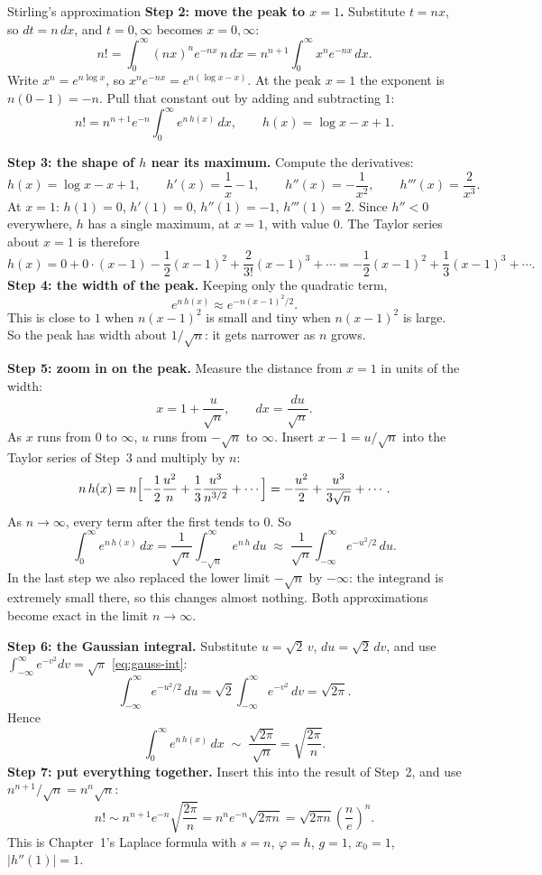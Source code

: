 \documentclass[11pt]{beamer}
\begin{document}
\begin{frame}[allowframebreaks=1.00]{Stirling's approximation}
\textbf{Step 2: move the peak to \(x=1\).} Substitute \(t=nx\), so \(dt=n\,dx\), and \(t=0,\infty\)
becomes \(x=0,\infty\):
\[
  n!=\int_0^\infty (nx)^n e^{-nx}\,n\,dx
   =n^{n+1}\int_0^\infty x^n e^{-nx}\,dx .
\]
Write \(x^n=e^{n\log x}\), so \(x^ne^{-nx}=e^{n(\log x-x)}\). At the peak \(x=1\) the exponent is
\(n(0-1)=-n\). Pull that constant out by adding and subtracting \(1\):
\[
  n!=n^{n+1}e^{-n}\int_0^\infty e^{n\,h(x)}\,dx,
  \qquad
  h(x)=\log x-x+1 .
\]
\par\framebreak\par
\textbf{Step 3: the shape of \(h\) near its maximum.} Compute the derivatives:
\[
  h(x)=\log x-x+1,\qquad h'(x)=\frac1x-1,\qquad h''(x)=-\frac1{x^2},\qquad h'''(x)=\frac2{x^3}.
\]
At \(x=1\): \(h(1)=0\), \(h'(1)=0\), \(h''(1)=-1\), \(h'''(1)=2\). Since \(h''<0\) everywhere, \(h\)
has a single maximum, at \(x=1\), with value \(0\). The Taylor series about \(x=1\) is therefore
\[
  h(x)=0+0\cdot(x-1)-\frac12(x-1)^2+\frac{2}{3!}(x-1)^3+\cdots
      =-\frac12(x-1)^2+\frac13(x-1)^3+\cdots .
\]
\textbf{Step 4: the width of the peak.} Keeping only the quadratic term,
\[
  e^{n\,h(x)}\approx e^{-n(x-1)^2/2}.
\]
This is close to \(1\) when \(n(x-1)^2\) is small and tiny when \(n(x-1)^2\) is large. So the peak
has width about \(1/\sqrt n\): it gets narrower as \(n\) grows.
\par\framebreak\par
\textbf{Step 5: zoom in on the peak.} Measure the distance from \(x=1\) in units of the width:
\[
  x=1+\frac{u}{\sqrt n},\qquad dx=\frac{du}{\sqrt n}.
\]
As \(x\) runs from \(0\) to \(\infty\), \(u\) runs from \(-\sqrt n\) to \(\infty\). Insert
\(x-1=u/\sqrt n\) into the Taylor series of Step~3 and multiply by \(n\):
\[
  n\,h(x)=n\Bigl[-\frac12\frac{u^2}{n}+\frac13\frac{u^3}{n^{3/2}}+\cdots\Bigr]
  =-\frac{u^2}{2}+\frac{u^3}{3\sqrt n}+\cdots .
\]
As \(n\to\infty\), every term after the first tends to \(0\). So
\[
  \int_0^\infty e^{n\,h(x)}\,dx
   =\frac1{\sqrt n}\int_{-\sqrt n}^{\infty}e^{n\,h}\,du
   \;\approx\;\frac1{\sqrt n}\int_{-\infty}^{\infty}e^{-u^2/2}\,du .
\]
In the last step we also replaced the lower limit \(-\sqrt n\) by \(-\infty\): the integrand is
extremely small there, so this changes almost nothing. Both approximations become exact in the
limit \(n\to\infty\).
\par\framebreak\par
\textbf{Step 6: the Gaussian integral.} Substitute \(u=\sqrt2\,v\), \(du=\sqrt2\,dv\), and use
\(\int_{-\infty}^{\infty}e^{-v^2}dv=\sqrt\pi\) \eqref{eq:gauss-int}:
\[
  \int_{-\infty}^{\infty}e^{-u^2/2}\,du=\sqrt2\int_{-\infty}^{\infty}e^{-v^2}\,dv=\sqrt{2\pi}.
\]
Hence
\[
  \int_0^\infty e^{n\,h(x)}\,dx\;\sim\;\frac{\sqrt{2\pi}}{\sqrt n}=\sqrt{\frac{2\pi}{n}} .
\]
\textbf{Step 7: put everything together.} Insert this into the result of Step~2, and use
\(n^{n+1}/\sqrt n=n^n\sqrt n\):
\begin{equation}
 n!\sim n^{n+1}e^{-n}\sqrt{\frac{2\pi}{n}}
   =n^ne^{-n}\sqrt{2\pi n}
   =\sqrt{2\pi n}\left(\frac ne\right)^n.
 \label{eq:stirling}
\end{equation}
This is Chapter~1's Laplace formula with \(s=n\), \(\varphi=h\), \(g=1\), \(x_0=1\), \(|h''(1)|=1\).


\end{frame}
\end{document}
